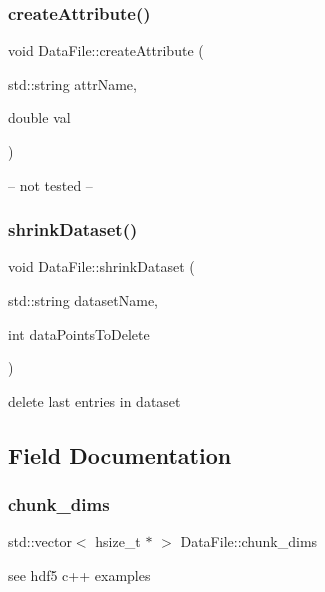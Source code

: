 \subsubsection{\texorpdfstring{create\+Attribute()}{createAttribute()}}
{\footnotesize\ttfamily void Data\+File\+::create\+Attribute (\begin{DoxyParamCaption}\item[{std\+::string}]{attr\+Name,  }\item[{double}]{val }\end{DoxyParamCaption})}

-- not tested -- \mbox{\label{classDataFile_add6a93dae24197b5dcd9e6824f77856c}} 
\subsubsection{\texorpdfstring{shrink\+Dataset()}{shrinkDataset()}}
{\footnotesize\ttfamily void Data\+File\+::shrink\+Dataset (\begin{DoxyParamCaption}\item[{std\+::string}]{dataset\+Name,  }\item[{int}]{data\+Points\+To\+Delete }\end{DoxyParamCaption})}

delete last entries in dataset 

\subsection{Field Documentation}
\mbox{\label{classDataFile_afec13483acd0763fbe2b635c5bf459f9}} 
\subsubsection{\texorpdfstring{chunk\+\_\+dims}{chunk\_dims}}
{\footnotesize\ttfamily std\+::vector$<$ hsize\+\_\+t $\ast$ $>$ Data\+File\+::chunk\+\_\+dims\hspace{0.3cm}{\ttfamily [private]}}

see hdf5 c++ examples \mbox{\label{classDataFile_affee6a54566b327d75def5fb21a9351b}} 
